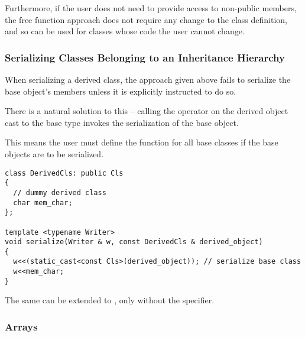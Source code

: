 \documentclass{article}
\begin{document}
Furthermore, if the user does not need to provide access to non-public
members, the free  function approach does not require
any change to the class definition, and so can be used for classes
whose code the user cannot change.

\subsubsection{Serializing Classes Belonging to an Inheritance Hierarchy}

When serializing a derived class, the approach given above fails to
serialize the base object's members unless it is explicitly instructed
to do so.

There is a natural solution to this -- calling the \code{<<} operator
on the derived object cast to the base type invokes the serialization
of the base object.

This means the user must define the  function for all
base classes if the base objects are to be serialized.

\begin{lstlisting}
class DerivedCls: public Cls
{
  // dummy derived class
  char mem_char;
};

template <typename Writer>
void serialize(Writer & w, const DerivedCls & derived_object)
{
  w<<(static_cast<const Cls>(derived_object)); // serialize base class
  w<<mem_char;
}
\end{lstlisting}

The same can be extended to , only without the
 specifier.

\subsubsection{Arrays}
\end{document}
